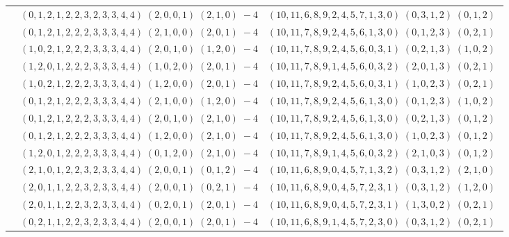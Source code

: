 \documentclass[11pt]{article}
\begin{document}
\begin{longtable}[l]{|c|c|c|}
 \cline{2-3} 
 & $(0 ,1 ,2 ,1 ,2 ,2 ,3 ,2 ,3 ,3 ,4 ,4) \;(2 ,0 ,0 ,1) \;(2 ,1 ,0) \;-4$ & $(10 ,11 ,6 ,8 ,9 ,2 ,4 ,5 ,7 ,1 ,3 ,0) \;(0 ,3 ,1 ,2) \;(0 ,1 ,2) \;$\\ 
 \cline{2-3} 
 & $(0 ,1 ,2 ,1 ,2 ,2 ,2 ,3 ,3 ,3 ,4 ,4) \;(2 ,1 ,0 ,0) \;(2 ,0 ,1) \;-4$ & $(10 ,11 ,7 ,8 ,9 ,2 ,4 ,5 ,6 ,1 ,3 ,0) \;(0 ,1 ,2 ,3) \;(0 ,2 ,1) \;$\\ 
 \cline{2-3} 
 & $(1 ,0 ,2 ,1 ,2 ,2 ,2 ,3 ,3 ,3 ,4 ,4) \;(2 ,0 ,1 ,0) \;(1 ,2 ,0) \;-4$ & $(10 ,11 ,7 ,8 ,9 ,2 ,4 ,5 ,6 ,0 ,3 ,1) \;(0 ,2 ,1 ,3) \;(1 ,0 ,2) \;$\\ 
 \cline{2-3} 
 & $(1 ,2 ,0 ,1 ,2 ,2 ,2 ,3 ,3 ,3 ,4 ,4) \;(1 ,0 ,2 ,0) \;(2 ,0 ,1) \;-4$ & $(10 ,11 ,7 ,8 ,9 ,1 ,4 ,5 ,6 ,0 ,3 ,2) \;(2 ,0 ,1 ,3) \;(0 ,2 ,1) \;$\\ 
 \cline{2-3} 
 & $(1 ,0 ,2 ,1 ,2 ,2 ,2 ,3 ,3 ,3 ,4 ,4) \;(1 ,2 ,0 ,0) \;(2 ,0 ,1) \;-4$ & $(10 ,11 ,7 ,8 ,9 ,2 ,4 ,5 ,6 ,0 ,3 ,1) \;(1 ,0 ,2 ,3) \;(0 ,2 ,1) \;$\\ 
 \cline{2-3} 
 & $(0 ,1 ,2 ,1 ,2 ,2 ,2 ,3 ,3 ,3 ,4 ,4) \;(2 ,1 ,0 ,0) \;(1 ,2 ,0) \;-4$ & $(10 ,11 ,7 ,8 ,9 ,2 ,4 ,5 ,6 ,1 ,3 ,0) \;(0 ,1 ,2 ,3) \;(1 ,0 ,2) \;$\\ 
 \cline{2-3} 
 & $(0 ,1 ,2 ,1 ,2 ,2 ,2 ,3 ,3 ,3 ,4 ,4) \;(2 ,0 ,1 ,0) \;(2 ,1 ,0) \;-4$ & $(10 ,11 ,7 ,8 ,9 ,2 ,4 ,5 ,6 ,1 ,3 ,0) \;(0 ,2 ,1 ,3) \;(0 ,1 ,2) \;$\\ 
 \cline{2-3} 
 & $(0 ,1 ,2 ,1 ,2 ,2 ,2 ,3 ,3 ,3 ,4 ,4) \;(1 ,2 ,0 ,0) \;(2 ,1 ,0) \;-4$ & $(10 ,11 ,7 ,8 ,9 ,2 ,4 ,5 ,6 ,1 ,3 ,0) \;(1 ,0 ,2 ,3) \;(0 ,1 ,2) \;$\\ 
 \cline{2-3} 
 & $(1 ,2 ,0 ,1 ,2 ,2 ,2 ,3 ,3 ,3 ,4 ,4) \;(0 ,1 ,2 ,0) \;(2 ,1 ,0) \;-4$ & $(10 ,11 ,7 ,8 ,9 ,1 ,4 ,5 ,6 ,0 ,3 ,2) \;(2 ,1 ,0 ,3) \;(0 ,1 ,2) \;$\\ 
 \cline{2-3} 
 & $(2 ,1 ,0 ,1 ,2 ,2 ,3 ,2 ,3 ,3 ,4 ,4) \;(2 ,0 ,0 ,1) \;(0 ,1 ,2) \;-4$ & $(10 ,11 ,6 ,8 ,9 ,0 ,4 ,5 ,7 ,1 ,3 ,2) \;(0 ,3 ,1 ,2) \;(2 ,1 ,0) \;$\\ 
 \cline{2-3} 
 & $(2 ,0 ,1 ,1 ,2 ,2 ,3 ,2 ,3 ,3 ,4 ,4) \;(2 ,0 ,0 ,1) \;(0 ,2 ,1) \;-4$ & $(10 ,11 ,6 ,8 ,9 ,0 ,4 ,5 ,7 ,2 ,3 ,1) \;(0 ,3 ,1 ,2) \;(1 ,2 ,0) \;$\\ 
 \cline{2-3} 
 & $(2 ,0 ,1 ,1 ,2 ,2 ,3 ,2 ,3 ,3 ,4 ,4) \;(0 ,2 ,0 ,1) \;(2 ,0 ,1) \;-4$ & $(10 ,11 ,6 ,8 ,9 ,0 ,4 ,5 ,7 ,2 ,3 ,1) \;(1 ,3 ,0 ,2) \;(0 ,2 ,1) \;$\\ 
 \cline{2-3} 
 & $(0 ,2 ,1 ,1 ,2 ,2 ,3 ,2 ,3 ,3 ,4 ,4) \;(2 ,0 ,0 ,1) \;(2 ,0 ,1) \;-4$ & $(10 ,11 ,6 ,8 ,9 ,1 ,4 ,5 ,7 ,2 ,3 ,0) \;(0 ,3 ,1 ,2) \;(0 ,2 ,1) \;$\\ 

\end{longtable}
\end{document}
